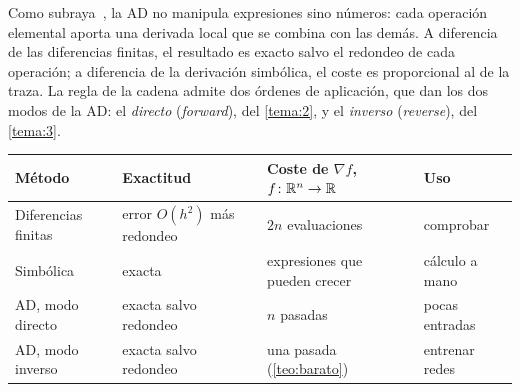 Como subraya~\cite[§3]{baydin}, la AD no manipula expresiones sino números: cada operación elemental aporta una derivada local que se combina con las demás. A diferencia de las diferencias finitas, el resultado es exacto salvo el redondeo de cada operación; a diferencia de la derivación simbólica, el coste es proporcional al de la traza. La regla de la cadena admite dos órdenes de aplicación, que dan los dos modos de la AD: el \emph{directo} (\emph{forward}), del \cref{tema:2}, y el \emph{inverso} (\emph{reverse}), del \cref{tema:3}.

\begin{center}\small
\begin{tabular}{@{}llll@{}}
\toprule
Método & Exactitud & Coste de $\nabla f$, $f\colon\mathbb{R}^{n}\to\mathbb{R}$ & Uso \\
\midrule
Diferencias finitas & error $O(h^{2})$ más redondeo & $2n$ evaluaciones & comprobar \\
Simbólica & exacta & expresiones que pueden crecer & cálculo a mano \\
AD, modo directo & exacta salvo redondeo & $n$ pasadas & pocas entradas \\
AD, modo inverso & exacta salvo redondeo & una pasada (\cref{teo:barato}) & entrenar redes \\
\bottomrule
\end{tabular}
\end{center}

\addtocounter{definicion}{1}%

